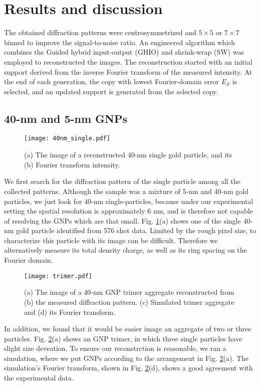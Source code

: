 \documentclass[10pt,letterpaper]{article}
\begin{document}
\section{Results and discussion}

The obtained diffraction patterns were centrosymmetrized and $5\times5$ or $7\times7$ binned to improve the signal-to-noise ratio. 
An engineered algorithm which combines the Guided hybrid input-output (GHIO) \cite{ghio} and shrink-wrap (SW) \cite{sw} was employed to reconstructed the images. 
The reconstruction started with an initial support derived from the inverse Fourier transform of the measured intensity. 
At the end of each generation, the copy with lowest Fourier-domain error $E_F$ is selected, and an updated support is generated from the selected copy.


\subsection{40-nm and 5-nm GNPs}

\begin{figure}
	\texttt{[image: 40nm\_single.pdf]}%
	\caption{(a) The image of a reconstructed 40-nm single gold particle, and its (b) Fourier transform intensity.}
	\label{fig:40nm_single}
\end{figure}

We first search for the diffraction pattern of the single particle among all the collected patterns. 
Although the sample was a mixture of 5-nm and 40-nm gold particles, we just look for 40-nm single-particles, because under our experimental setting the spatial resolution is approximately 6 nm, and is therefore not capable of resolving the GNPs which are that small.
Fig. \ref{fig:40nm_single}(a) shows one of the single 40-nm gold particle identified from 576 shot data.
Limited by the rough pixel size, to characterize this particle with its image can be difficult.
Therefore we alternatively measure its total density charge, as well as its ring spacing on the Fourier domain.

\begin{figure}
	\texttt{[image: trimer.pdf]}%
	\caption{(a) The image of a 40-nm GNP trimer aggregate reconstructed from (b) the measured diffraction pattern. (c) Simulated trimer aggregate and (d) its Fourier transform.}
	\label{fig:trimer}
\end{figure}

In addition, we found that it would be easier image an aggregate of two or three particles. 
Fig. \ref{fig:trimer}(a) shows an GNP trimer, in which three single particles have slight size deveation.
To ensure our reconstrction is reasonable, we ran a simulation, where we put GNPs according to the arrangement in Fig. \ref{fig:trimer}(a). 
The simulation's Fourier transform, shown in Fig. \ref{fig:trimer}(d), shows a good agreement with the experimental data.
\end{document}
